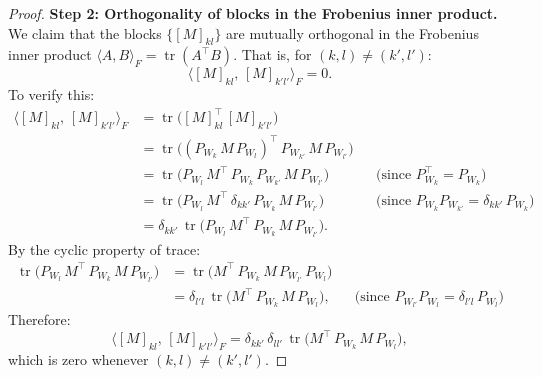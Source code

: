 \begin{proof}
\medskip\noindent\textbf{Step 2: Orthogonality of blocks in the Frobenius inner product.}
We claim that the blocks $\{[M]_{kl}\}$ are mutually orthogonal in the Frobenius inner
product $\langle A, B \rangle_F = \operatorname{tr}(A^\top B)$. That is, for $(k, l) \neq
(k', l')$:
\[
    \langle [M]_{kl},\, [M]_{k'l'}\rangle_F = 0.
\]
To verify this:
\begin{align*}
    \langle [M]_{kl},\, [M]_{k'l'}\rangle_F
    &= \operatorname{tr}\!\big([M]_{kl}^\top\, [M]_{k'l'}\big) \\
    &= \operatorname{tr}\!\big((P_{W_k}\, M\, P_{W_l})^\top\, P_{W_{k'}}\, M\,
       P_{W_{l'}}\big) \\
    &= \operatorname{tr}\!\big(P_{W_l}\, M^\top\, P_{W_k}\, P_{W_{k'}}\, M\,
       P_{W_{l'}}\big)
       && \text{(since } P_{W_k}^\top = P_{W_k}\text{)} \\
    &= \operatorname{tr}\!\big(P_{W_l}\, M^\top\, \delta_{kk'}\, P_{W_k}\, M\,
       P_{W_{l'}}\big)
       && \text{(since } P_{W_k} P_{W_{k'}} = \delta_{kk'}\, P_{W_k}\text{)} \\
    &= \delta_{kk'}\, \operatorname{tr}\!\big(P_{W_l}\, M^\top\, P_{W_k}\, M\,
       P_{W_{l'}}\big).
\end{align*}
By the cyclic property of trace:
\begin{align*}
    \operatorname{tr}\!\big(P_{W_l}\, M^\top\, P_{W_k}\, M\, P_{W_{l'}}\big)
    &= \operatorname{tr}\!\big(M^\top\, P_{W_k}\, M\, P_{W_{l'}}\, P_{W_l}\big) \\
    &= \delta_{l'l}\, \operatorname{tr}\!\big(M^\top\, P_{W_k}\, M\, P_{W_l}\big),
    && \text{(since } P_{W_{l'}} P_{W_l} = \delta_{l'l}\, P_{W_l}\text{)}
\end{align*}
Therefore:
\[
    \langle [M]_{kl},\, [M]_{k'l'}\rangle_F = \delta_{kk'}\, \delta_{ll'}\,
    \operatorname{tr}\!\big(M^\top\, P_{W_k}\, M\, P_{W_l}\big),
\]
which is zero whenever $(k, l) \neq (k', l')$.


\end{proof}
